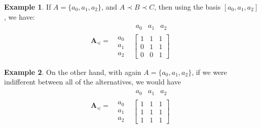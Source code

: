 \documentclass{article}
\theoremstyle{plain}
\theoremstyle{definition}
\newtheorem{example}{Example}[section]
\theoremstyle{remark}
\newcommand\leqc{\preccurlyeq}
\newcommand\mat[1]{\mathbf #1}
\begin{document}
	\begin{minipage}{0.47\linewidth}
		\begin{example}\label{ex:mat1}
			If $A = \{a_0, a_1, a_2\}$, and $A \prec B \prec C$, then using the basis $[a_0, a_1, a_2]$, we have: 
			\[\mat A_\leqc =~ \begin{matrix} & \begin{matrix}a_0 & a_1 & a_2\end{matrix} \\[0.2em]
			\begin{matrix}a_0 \\ a_1 \\ a_2\end{matrix} & \begin{bmatrix}
			1 & 1 & 1 \\
			0 & 1 & 1 \\
			0 & 0 & 1
			\end{bmatrix}\end{matrix} \]
		\end{example}
	\end{minipage}
	\hfill
	\begin{minipage}{0.47\linewidth}
		\begin{example}\label{ex:mat2}
			On the other hand, with again  $A = \{a_0, a_1, a_2\}$, if we were indifferent between all of the alternatives, we would have
			\[\mat A_\leqc =~ \begin{matrix} & \begin{matrix}a_0 & a_1 & a_2\end{matrix} \\[0.2em]
			\begin{matrix}a_0 \\ a_1 \\ a_2\end{matrix} & \begin{bmatrix}
			1 & 1 & 1 \\
			1 & 1 & 1 \\
			1 & 1 & 1
			\end{bmatrix}\end{matrix} \]
		\end{example}
	\end{minipage}\\

	
\end{document}
